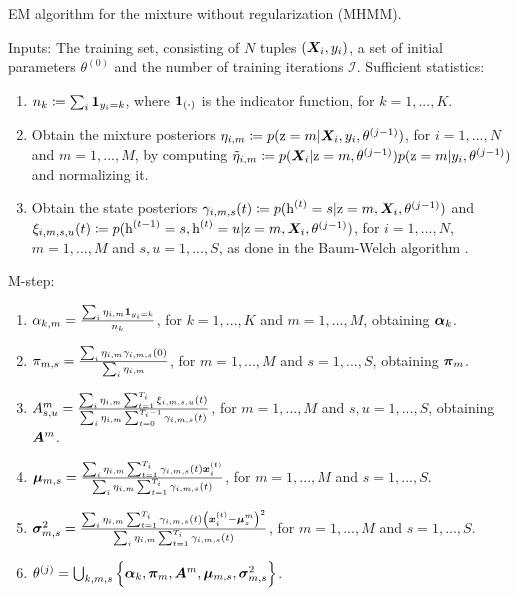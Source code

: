 \begin{algorithm}
	\caption{EM algorithm for the mixture without regularization (MHMM).}
	\label{alg:mhmm}
	\begin{algorithmic}
		\State Inputs: The training set, consisting of $N$ tuples $({\bm{X}}_i,y_i)$, a set of initial parameters $\theta^{(0)}$ and the number of training iterations $\mathcal{I}$.
		\State Sufficient statistics:
		\begin{enumerate}
			\item $n_k \coloneqq \sum_i \bm{1}_{y_i=k}$, where $\bm{1}_\mathrm{(\boldsymbol{\cdot})}$ is the indicator function, for $k=1,...,K$.
			\item Obtain the mixture posteriors $\eta_{i,m} \coloneqq p({\textnormal{z}}=m|{\bm{X}}_i, y_i,\theta^{(j-1)})$, for $i=1,...,N$ and $m=1,...,M$, by computing  $\tilde{\eta}_{i,m} \coloneqq p({\bm{X}}_i|{\textnormal{z}}=m, \theta^{(j-1)})p({\textnormal{z}}=m|y_i, \theta^{(j-1)})$ and normalizing it.
			\item Obtain the state posteriors $\gamma_{i,m,s}(t) \coloneqq p({\textnormal{h}}^{(t)}=s | {\textnormal{z}}=m, {\bm{X}}_i, \theta^{(j-1)})$ and $\xi_{i,m,s,u}(t) \coloneqq p({\textnormal{h}}^{(t-1)}=s, {\textnormal{h}}^{(t)}=u | {\textnormal{z}}=m, {\bm{X}}_i, \theta^{(j-1)})$, for $i=1,...,N$, $m=1,...,M$ and $s,u=1,...,S$, as done in the Baum-Welch algorithm \citet{Baum1972}.
		\end{enumerate}
		\State M-step:
		\begin{enumerate}
			\item ${\alpha}_{k,m} = \frac{\sum_i \eta_{i,m} \bm{1}_{y_i=k}}{n_k}$, for $k=1,...,K$ and $m=1,...,M$, obtaining ${\bm{\alpha}}_k$.
			\item ${\pi}_{m,s} = \frac{\sum_i \eta_{i,m} \gamma_{i,m,s}(0)}{\sum_i \eta_{i,m}}$, for $m=1,...,M$ and $s=1,...,S$, obtaining ${\bm{\pi}}_{m}$. 
			\item ${A}^m_{s,u} = \frac{\sum_i \eta_{i,m} \sum_{t=1}^{T_i} \xi_{i,m,s,u}(t)}{\sum_i \eta_{i,m} \sum_{t=0}^{T_i-1} \gamma_{i,m,s}(t)}$, for $m=1,...,M$ and $s,u=1,...,S$, obtaining ${\bm{A}}^m$.
			\item ${\bm{\mu}}_{m,s} = \frac{\sum_i \eta_{i,m} \sum_{t=1}^{T_i} \gamma_{i,m,s}(t) {\bm{x}}_i^{(t)}} {\sum_i \eta_{i,m} \sum_{t=1}^{T_i} \gamma_{i,m,s}(t)}$, for $m=1,...,M$ and $s=1,...,S$.
			\item ${\bm{\sigma}}^2_{m,s} = \frac{\sum_i \eta_{i,m} \sum_{t=1}^{T_i} \gamma_{i,m,s}(t) \left({\bm{x}}_i^{(t)} - \boldsymbol{\mu}^m_s\right)^2} {\sum_i \eta_{i,m} \sum_{t=1}^{T_i} \gamma_{i,m,s}(t)}$, for $m=1,...,M$ and $s=1,...,S$.
			\item $\theta^{(j)} = \bigcup_{k,m,s} \left\lbrace \boldsymbol{\alpha}_k, {\bm{\pi}}_{m}, {\bm{A}}^m, {\bm{\mu}}_{m,s}, {\bm{\sigma}}^2_{m,s} \right\rbrace$.
		\end{enumerate}
		\EndFor  
	\end{algorithmic}
\end{algorithm}

